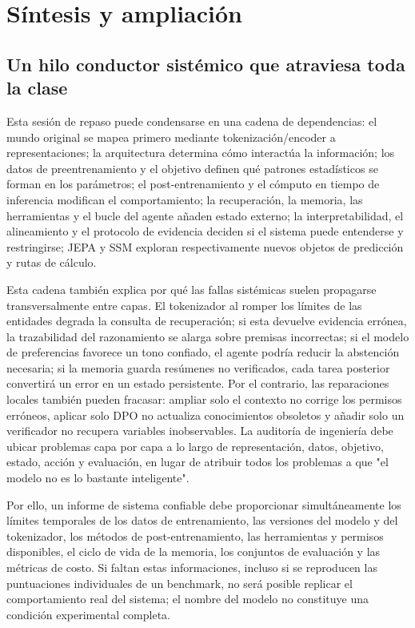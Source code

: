 \section{Síntesis y ampliación}

\subsection{Un hilo conductor sistémico que atraviesa toda la clase}

Esta sesión de repaso puede condensarse en una cadena de dependencias: el mundo original se mapea primero mediante tokenización/encoder a representaciones; la arquitectura determina cómo interactúa la información; los datos de preentrenamiento y el objetivo definen qué patrones estadísticos se forman en los parámetros; el post-entrenamiento y el cómputo en tiempo de inferencia modifican el comportamiento; la recuperación, la memoria, las herramientas y el bucle del agente añaden estado externo; la interpretabilidad, el alineamiento y el protocolo de evidencia deciden si el sistema puede entenderse y restringirse; JEPA y SSM exploran respectivamente nuevos objetos de predicción y rutas de cálculo.

Esta cadena también explica por qué las fallas sistémicas suelen propagarse transversalmente entre capas. El tokenizador al romper los límites de las entidades degrada la consulta de recuperación; si esta devuelve evidencia errónea, la trazabilidad del razonamiento se alarga sobre premisas incorrectas; si el modelo de preferencias favorece un tono confiado, el agente podría reducir la abstención necesaria; si la memoria guarda resúmenes no verificados, cada tarea posterior convertirá un error en un estado persistente. Por el contrario, las reparaciones locales también pueden fracasar: ampliar solo el contexto no corrige los permisos erróneos, aplicar solo DPO no actualiza conocimientos obsoletos y añadir solo un verificador no recupera variables inobservables. La auditoría de ingeniería debe ubicar problemas capa por capa a lo largo de representación, datos, objetivo, estado, acción y evaluación, en lugar de atribuir todos los problemas a que "el modelo no es lo bastante inteligente".

Por ello, un informe de sistema confiable debe proporcionar simultáneamente los límites temporales de los datos de entrenamiento, las versiones del modelo y del tokenizador, los métodos de post-entrenamiento, las herramientas y permisos disponibles, el ciclo de vida de la memoria, los conjuntos de evaluación y las métricas de costo. Si faltan estas informaciones, incluso si se reproducen las puntuaciones individuales de un benchmark, no será posible replicar el comportamiento real del sistema; el nombre del modelo no constituye una condición experimental completa.

